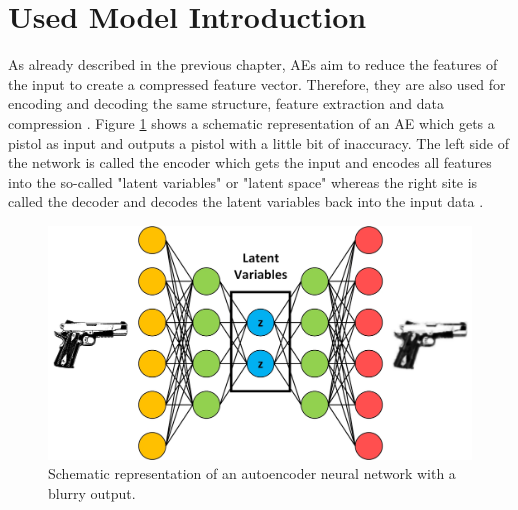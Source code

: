 \documentclass[MGS,Master,english]{twbook}%
\begin{document}
\section{Used Model Introduction}
As already described in the previous chapter, \acp{AE} aim to reduce the features of the input to create a compressed feature vector. Therefore, they are also used for encoding and decoding the same structure, feature extraction and data compression \cite{ml::book::nnProgrammingTF}. Figure \ref{fig::autoencoder} shows a schematic representation of an \ac{AE} which gets a pistol as input and outputs a pistol with a little bit of inaccuracy. The left side of the network is called the encoder which gets the input and encodes all features into the so-called "latent variables" or "latent space" whereas the right site is called the decoder and decodes the latent variables back into the input data \cite{ml::book::nnProgrammingTF}. 
\begin{figure}[!htbp]
	\centering
	\includegraphics[width=0.9\linewidth]{PICs/NNs/autoencoder}
	\caption{Schematic representation of an autoencoder neural network with a blurry output.} \label{fig::autoencoder}
\end{figure}
\end{document}
